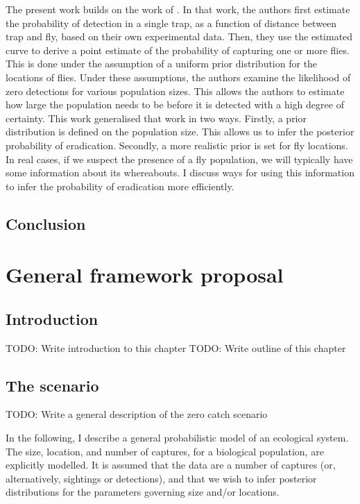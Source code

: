 \documentclass[
  oneside]{book}
\begin{document}
The present work builds on the work of \citet{lg1994}. In that work, the authors first estimate the probability of detection in a single trap, as a function of distance between trap and fly, based on their own experimental data. Then, they use the estimated curve to derive a point estimate of the probability of capturing one or more flies. This is done under the assumption of a uniform prior distribution for the locations of flies. Under these assumptions, the authors examine the likelihood of zero detections for various population sizes. This allows the authors to estimate how large the population needs to be before it is detected with a high degree of certainty. This work generalised that work in two ways. Firstly, a prior distribution is defined on the population size. This allows us to infer the posterior probability of eradication. Secondly, a more realistic prior is set for fly locations. In real cases, if we suspect the presence of a fly population, we will typically have some information about its whereabouts. I discuss ways for using this information to infer the probability of eradication more efficiently.

\hypertarget{conclusion}{%
\section{Conclusion}\label{conclusion}}

\hypertarget{general-framework-proposal}{%
\chapter{General framework proposal}\label{general-framework-proposal}}

\hypertarget{introduction-2}{%
\section{Introduction}\label{introduction-2}}

TODO: Write introduction to this chapter
TODO: Write outline of this chapter

\hypertarget{the-scenario}{%
\section{The scenario}\label{the-scenario}}

TODO: Write a general description of the zero catch scenario

In the following, I describe a general probabilistic model of an ecological system. The size, location, and number of captures, for a biological population, are explicitly modelled. It is assumed that the data are a number of captures (or, alternatively, sightings or detections), and that we wish to infer posterior distributions for the parameters governing size and/or locations.
\end{document}
